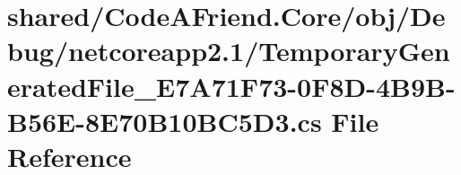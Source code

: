 \hypertarget{shared_2_code_a_friend_8_core_2obj_2_debug_2netcoreapp2_81_2_temporary_generated_file___e7_a71_fc7ce6f84e1ba351e61592f0d39f377e0}{}\section{shared/\+Code\+A\+Friend.Core/obj/\+Debug/netcoreapp2.1/\+Temporary\+Generated\+File\+\_\+\+E7\+A71\+F73-\/0\+F8\+D-\/4\+B9\+B-\/\+B56\+E-\/8\+E70\+B10\+B\+C5\+D3.cs File Reference}
\label{shared_2_code_a_friend_8_core_2obj_2_debug_2netcoreapp2_81_2_temporary_generated_file___e7_a71_fc7ce6f84e1ba351e61592f0d39f377e0}
